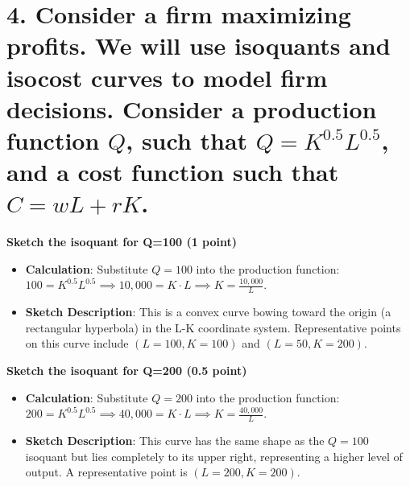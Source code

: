 \documentclass[11pt, letterpaper]{article}
\begin{document}
\section*{4. Consider a firm maximizing profits. We will use isoquants and isocost curves to model firm decisions. Consider a production function $Q$, such that $Q=K^{0.5}L^{0.5}$, and a cost function such that $C=wL+rK$.}

\textbf{Sketch the isoquant for Q=100 (1 point)}
\begin{itemize}[leftmargin=*]
    \item \textbf{Calculation}: Substitute $Q=100$ into the production function: $100 = K^{0.5}L^{0.5} \implies 10,000 = K \cdot L \implies K = \frac{10,000}{L}$.
    \item \textbf{Sketch Description}: This is a convex curve bowing toward the origin (a rectangular hyperbola) in the L-K coordinate system. Representative points on this curve include $(L=100, K=100)$ and $(L=50, K=200)$.
\end{itemize}
\begin{center}
\end{center}

\textbf{Sketch the isoquant for Q=200 (0.5 point)}
\begin{itemize}[leftmargin=*]
    \item \textbf{Calculation}: Substitute $Q=200$ into the production function: $200 = K^{0.5}L^{0.5} \implies 40,000 = K \cdot L \implies K = \frac{40,000}{L}$.
    \item \textbf{Sketch Description}: This curve has the same shape as the $Q=100$ isoquant but lies completely to its upper right, representing a higher level of output. A representative point is $(L=200, K=200)$.
\end{itemize}
\begin{center}
\end{center}
\end{document}
